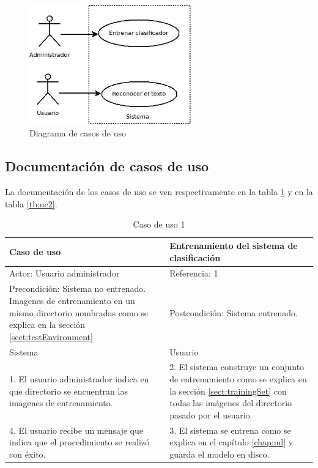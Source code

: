 \documentclass[a4paper, 11pt, oneside]{report}
\begin{document}
\begin{figure}[htb]
\begin{center}
\leavevmode
\includegraphics[width=7cm]{diagrams/casoUso.jpg}
\end{center}
\caption{Diagrama de casos de uso}
\label{fig:useCase}
\end{figure}

\subsection{Documentación de casos de uso}

La documentación de los casos de uso se ven respectivamente en la tabla \ref{tb:uc1} y en la tabla \ref{tb:uc2}.

\begin{table}
\begin{center}
\begin{tabular}{|p{6cm}|p{6cm}|}
	\hline
	Caso de uso & Entrenamiento del sistema de clasificación\\
	\hline
	Actor: Usuario administrador & Referencia: 1 \\
	\hline
	Precondición: Sistema no entrenado. Imagenes de entrenamiento en un mismo directorio nombradas como se explica en la sección \ref{sect:testEnvironment} & 
	Postcondición: Sistema entrenado. \\
	\hline
	Sistema & Usuario \\
	\hline
	1. El usuario administrador indica en que directorio se encuentran las imagenes de entrenamiento. &
	2. El sistema construye un conjunto de entrenamiento como se explica en la sección \ref{sect:trainingSet} con todas las imágenes del directorio pasado por el usuario. \\
	\hline
	4. El usuario recibe un mensaje que indica que el procedimiento se realizó c\label{eq:hu}on éxito. &
	3. El sistema se entrena como se explica en el capítulo \ref{chap:ml} y guarda el modelo en disco. \\
	\hline
\end{tabular}
\end{center}
\caption{Caso de uso 1}	
\label{tb:uc1}
\end{table}
\end{document}
